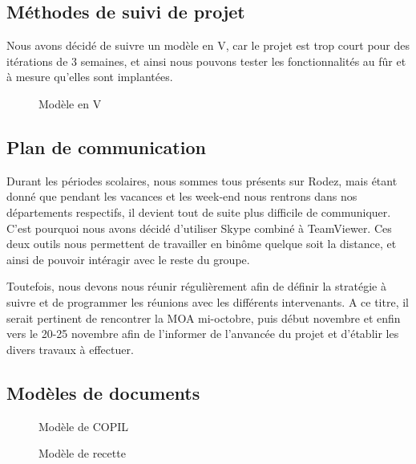 \documentclass[11pt]{report}
\begin{document}
\subsection{Méthodes de suivi de projet}
Nous avons décidé de suivre un modèle en V, car le projet est trop court pour 
des itérations de 3 semaines, et ainsi nous pouvons tester les fonctionnalités 
au fûr et à mesure qu'elles sont implantées.
\begin{figure}[htp] 
\caption{Modèle en V}
\end{figure}

\subsection{Plan de communication}
Durant les périodes scolaires, nous sommes tous présents sur Rodez, mais étant 
donné que pendant les vacances et les week-end nous rentrons dans nos 
départements respectifs, il devient tout de suite plus difficile de communiquer.
C'est pourquoi nous avons décidé d'utiliser Skype combiné à TeamViewer. Ces 
deux outils nous permettent de travailler en binôme quelque soit la distance, 
et ainsi de pouvoir intéragir avec le reste du groupe.\\
\par Toutefois, nous devons nous réunir régulièrement afin de définir la 
stratégie à suivre et de programmer les réunions avec les différents 
intervenants. A ce titre, il serait pertinent de rencontrer la MOA mi-octobre, 
puis début novembre et enfin vers le 20-25 novembre afin de l'informer 
de l'anvancée du projet et d'établir les divers travaux à effectuer.
\newpage

\subsection{Modèles de documents}
\begin{figure}[htp] \centering{
}
\caption{Modèle de COPIL}
\end{figure}
\newpage
\begin{figure}[htp] \centering{
}
\caption{Modèle de recette}
\end{figure}
\newpage
\end{document}
